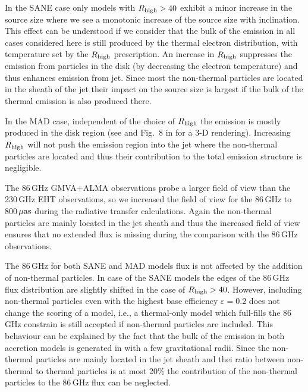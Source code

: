 In the SANE case only models with $R_\mathrm{high}>40$ exhibit a minor increase in the source size where we see a monotonic increase of the source size with inclination. This effect can be understood if we consider that the bulk of the emission in all cases considered here is still produced by the thermal electron distribution, with temperature set by the $R_\mathrm{high}$ prescription.  An increase in $R_\mathrm{high}$ suppresses the emission from particles in the disk (by decreasing the electron temperature) and thus enhances emission from jet.  Since most the non-thermal particles are located in the sheath of the jet their impact on the source size is largest if the bulk of the thermal emission is also produced there.


In the MAD case, independent of the choice of $R_\mathrm{high}$ the emission is mostly produced in the disk region (see  and Fig.~8 in \citet{Wong_2022} for a 3-D rendering). Increasing $R_\mathrm{high}$ will not push the emission region into the jet where the non-thermal particles are located and thus their contribution to the total emission structure is negligible.


The 86\,GHz GMVA+ALMA observations
probe a larger field of view than the 230\,GHz EHT observations, so we increased the field of view for the 86\,GHz to 800\,$\rm{\mu as}$ during the radiative transfer calculations. Again the non-thermal particles are mainly located in the jet sheath and thus the increased field of view ensures that no extended flux is missing during the comparison with the 86\,GHz observations.

The 86\,GHz for both SANE and MAD models flux is not affected by the addition of non-thermal particles. In case of the SANE models the edges of the 86\,GHz flux distribution are slightly shifted in the case of $R_\mathrm{high}>40$. However, including non-thermal particles even with the highest base efficiency $\varepsilon=0.2$ does not change the scoring of a model, i.e., a thermal-only model which full-fills the 86\,GHz constrain is still accepted if non-thermal particles are included. This behaviour can be explained by the fact that the bulk of the emission in both accretion models is generated in with a few gravitational radii. Since the non-thermal particles are mainly located in the jet sheath and thei ratio between non-thermal to thermal particles is at most 20\% the contribution of the non-thermal particles to the 86\,GHz flux can be neglected.

